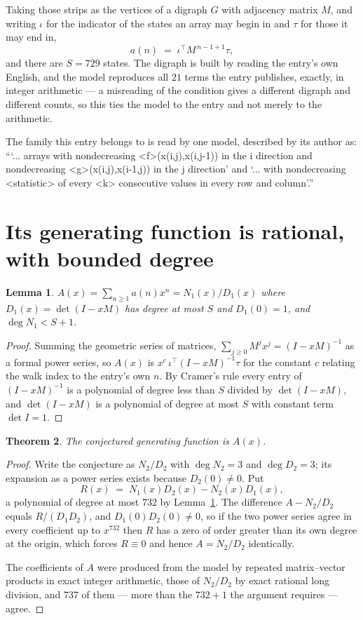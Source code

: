 \documentclass[11pt,a4paper]{article}
\theoremstyle{plain}
\newtheorem{theorem}{Theorem}
\newtheorem{lemma}[theorem]{Lemma}
\theoremstyle{definition}
\begin{document}
Taking those strips as the vertices of a digraph $G$ with adjacency matrix $M$, and writing
$\iota$ for the indicator of the states an array may begin in and $\tau$ for those it may end
in,
\[
a(n)\;=\;\iota^{\!\top}M^{\,n-1+1}\tau ,
\]
and there are $S=729$ states. The digraph is built by reading the entry's own English, and the
model reproduces all $21$ terms the entry publishes, exactly, in integer arithmetic --- a
misreading of the condition gives a different digraph and different counts, so this ties the
model to the entry and not merely to the arithmetic.

The family this entry belongs to is read by one model, described by its author as: ```... arrays with nondecreasing <f>(x(i,j),x(i,j-1)) in the i direction and nondecreasing <g>(x(i,j),x(i-1,j)) in the j direction' and `... with nondecreasing <statistic> of every <k> consecutive values in every row and column'.''


\section{Its generating function is rational, with bounded degree}

\begin{lemma}\label{lem:rat}
$A(x)=\sum_{n\ge1}a(n)x^n=N_1(x)/D_1(x)$ where $D_1(x)=\det(I-xM)$ has degree at most
$S$ and $D_1(0)=1$, and $\deg N_1<S+1$.
\end{lemma}

\begin{proof}
Summing the geometric series of matrices, $\sum_{j\ge0}M^jx^j=(I-xM)^{-1}$ as a formal
power series, so $A(x)$ is $x^{c}\,\iota^{\!\top}(I-xM)^{-1}\tau$ for the constant $c$
relating the walk index to the entry's own $n$. By Cramer's rule every entry of
$(I-xM)^{-1}$ is a polynomial of degree less than $S$ divided by $\det(I-xM)$, and
$\det(I-xM)$ is a polynomial of degree at most $S$ with constant term $\det I=1$.
\end{proof}

\begin{theorem}
The conjectured generating function is $A(x)$.
\end{theorem}

\begin{proof}
Write the conjecture as $N_2/D_2$ with $\deg N_2=3$ and $\deg D_2=3$; its expansion as a
power series exists because $D_2(0)\neq0$. Put
\[
R(x)\;=\;N_1(x)D_2(x)-N_2(x)D_1(x),
\]
a polynomial of degree at most $732$ by Lemma~\ref{lem:rat}. The difference
$A-N_2/D_2$ equals $R/(D_1D_2)$, and $D_1(0)D_2(0)\neq0$, so if the two power series agree in
every coefficient up to $x^{732}$ then $R$ has a zero of order greater than its own
degree at the origin, which forces $R\equiv0$ and hence $A=N_2/D_2$ identically.

The coefficients of $A$ were produced from the model by repeated matrix--vector products in
exact integer arithmetic, those of $N_2/D_2$ by exact rational long division, and $737$
of them --- more than the $732+1$ the argument requires --- agree.
\end{proof}
\end{document}
